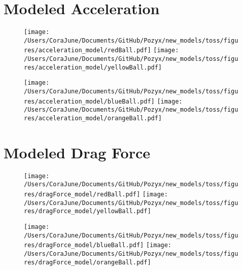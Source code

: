 \documentclass{article}
\begin{document}
\section{Modeled Acceleration}
\begin{figure}[h!]
\begin{multicols}{2}
    \texttt{[image: /Users/CoraJune/Documents/GitHub/Pozyx/new\_models/toss/figures/acceleration\_model/redBall.pdf]}
    \texttt{[image: /Users/CoraJune/Documents/GitHub/Pozyx/new\_models/toss/figures/acceleration\_model/yellowBall.pdf]}
\end{multicols}

\begin{multicols}{2}
    \texttt{[image: /Users/CoraJune/Documents/GitHub/Pozyx/new\_models/toss/figures/acceleration\_model/blueBall.pdf]}
    \texttt{[image: /Users/CoraJune/Documents/GitHub/Pozyx/new\_models/toss/figures/acceleration\_model/orangeBall.pdf]}
\end{multicols}

\end{figure}
\newpage
\section{Modeled Drag Force}
\begin{figure}[h!]
\begin{multicols}{2}
    \texttt{[image: /Users/CoraJune/Documents/GitHub/Pozyx/new\_models/toss/figures/dragForce\_model/redBall.pdf]}
    \texttt{[image: /Users/CoraJune/Documents/GitHub/Pozyx/new\_models/toss/figures/dragForce\_model/yellowBall.pdf]}
\end{multicols}

\begin{multicols}{2}
    \texttt{[image: /Users/CoraJune/Documents/GitHub/Pozyx/new\_models/toss/figures/dragForce\_model/blueBall.pdf]}
    \texttt{[image: /Users/CoraJune/Documents/GitHub/Pozyx/new\_models/toss/figures/dragForce\_model/orangeBall.pdf]}
\end{multicols}

\end{figure}
\newpage
\end{document}
